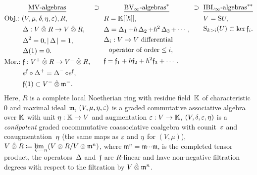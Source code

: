 \documentclass[\MainFolder/Text.tex]{subfiles}
\begin{document}
\begin{equation}\label{Eq:InclOfCat}
\begin{gathered}[t]
\underline{\MV\text{-algebras}} \\
\begin{aligned}
&\text{Obj.:}\ \begin{aligned}[t]
&(V,\MVProd,\MVCoProd,\MVUnit,\MVAug), R, \\
&\BVOp : V\COtimes R \rightarrow V\COtimes R,\\
& \BVOp^2 = 0, \Abs{\BVOp}=1, \\
& \BVOp(1) = 0.
\end{aligned}\\
&\text{Mor.:}\ \begin{aligned}[t]
&\MVMorF: V^+\COtimes R\rightarrow V^-\COtimes R, \\
&e^\MVMorF \circ \BVOp^+ = \BVOp^- \circ e^\MVMorF,  \\
&\MVMorF(1) \subset V^-\COtimes\mathfrak{m}^-.
\end{aligned}
\end{aligned}
\end{gathered}
\ \supset\ 
\begin{gathered}[t]
\underline{\text{$\BVInfty$\text{-algebras}}^{*}} \\
\begin{aligned}[t]
&R = \K[[\hbar]], \\
&\Delta= \BVOp_1 + \hbar \BVOp_2 + \hbar^2 \BVOp_3 + \dotsb, \\
& \begin{aligned}[t]\Delta_i: V \rightarrow V \text{ differential}\\\text{operator of order}\le i, \end{aligned}\\
&\MVMorF= \MVMorF_1 + \hbar \MVMorF_2 + \hbar^2 \MVMorF_3 + \dotsb.
\end{aligned}
\end{gathered}
\ \supset\ 
\begin{gathered}[t]
\underline{\text{$\IBLInfty$\text{-algebras}}^{**}} \\
\begin{aligned}
&V = \Sym U,  \\
&\Sym_{k > i}(U) \subset \ker \MVMorF_i.
\end{aligned}
\end{gathered}
\end{equation}
Here, $R$ is a complete local Noetherian ring with residue field~$\mathbb{K}$ of characteristic $0$ and maximal ideal~$\mathfrak{m}$, $(V,\mu,\eta,\varepsilon)$ is a graded commutative associative algebra over $\mathbb{K}$ with unit $\eta: \mathbb{K} \rightarrow V$ and augmentation $\varepsilon: V\rightarrow\mathbb{K}$, $(V,\delta,\varepsilon,\eta)$ is a \emph{conilpotent} graded cocommutative coassociative coalgebra with counit~$\varepsilon$ and coaugmentation~$\eta$ (the same maps as $\varepsilon$ and $\eta$ for $(V,\mu)$), $V\COtimes R \coloneqq \varprojlim_n (V\otimes R/V\otimes \mathfrak{m}^n)$, where $\mathfrak{m}^n = \mathfrak{m}\dotsb\mathfrak{m}$, is the completed tensor product, the operators~$\operatorname{\Delta}$ and~$\mathfrak{f}$ are $R$-linear and have non-negative filtration degrees with respect to the filtration by $V\COtimes \mathfrak{m}^n$.
\end{document}
